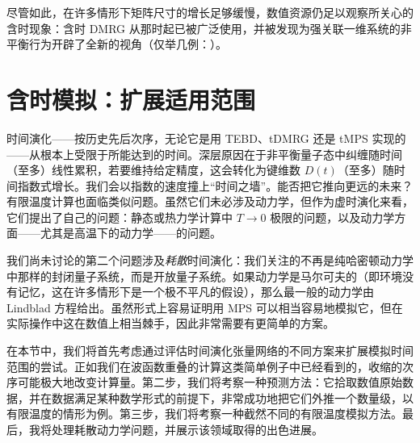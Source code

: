 尽管如此，在许多情形下矩阵尺寸的增长足够缓慢，数值资源仍足以观察所关心的含时现象：含时 DMRG 从那时起已被广泛使用，并被发现为强关联一维系统的非平衡行为开辟了全新的视角（仅举几例：\cite{WhiteFeiguin04,Feiguin05a,Feiguin05,Gobert05,Kollath05,Trebst06,Cramer08,Barthel09a,Kollath06}）。
 
\section{含时模拟：扩展适用范围}
\label{sec:beyondtime}

时间演化——按历史先后次序，无论它是用 TEBD、tDMRG 还是 tMPS 实现的——从根本上受限于所能达到的时间。深层原因在于非平衡量子态中纠缠随时间（至多）线性累积，若要维持给定精度，这会转化为键维数 $D(t)$（至多）随时间指数式增长。我们会以指数的速度撞上“时间之墙”。能否把它推向更远的未来？有限温度计算也面临类似问题。虽然它们未必涉及动力学，但作为虚时演化来看，它们提出了自己的问题：静态或热力学计算中 $T\rightarrow 0$ 极限的问题，以及动力学方面——尤其是高温下的动力学——的问题。

我们尚未讨论的第二个问题涉及{\em 耗散}时间演化：我们关注的不再是纯哈密顿动力学中那样的封闭量子系统，而是开放量子系统。如果动力学是马尔可夫的（即环境没有记忆，这在许多情形下是一个极不平凡的假设），那么最一般的动力学由 Lindblad 方程给出。虽然形式上容易证明用 MPS 可以相当容易地模拟它，但在实际操作中这在数值上相当棘手，因此非常需要有更简单的方案。 

在本节中，我们将首先考虑通过评估时间演化张量网络的不同方案来扩展模拟时间范围的尝试。正如我们在波函数重叠的计算这类简单例子中已经看到的，收缩的次序可能极大地改变计算量。第二步，我们将考察一种预测方法：它拾取数值原始数据，并在数据满足某种数学形式的前提下，非常成功地把它们外推一个数量级，以有限温度的情形为例。第三步，我们将考察一种截然不同的有限温度模拟方法。最后，我将处理耗散动力学问题，并展示该领域取得的出色进展。

